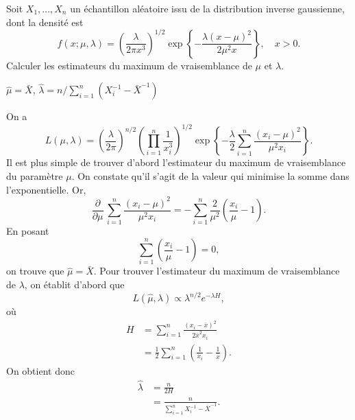 \begin{exercice}
  Soit $X_1, \dots, X_n$ un échantillon aléatoire issu de la
  distribution inverse gaussienne, dont la densité est
  \begin{displaymath}
    f(x; \mu,\lambda) =
    \left(
      \frac{\lambda}{2\pi x^3}
    \right)^{1/2}
    \exp\left\{
      -\frac{\lambda (x - \mu)^2}{2\mu^2 x}
    \right\}, \quad x > 0.
  \end{displaymath}
  Calculer les estimateurs du maximum de vraisemblance de $\mu$ et $\lambda$.
  \begin{rep}
    $\hat{\mu} = \bar{X}$, $\hat{\lambda} = n/\sum_{i = 1}^n
    (X_i^{-1} - \bar{X}^{-1})$
  \end{rep}
  \begin{sol}
    On a
    \begin{equation*}
      L(\mu ,\lambda) =
      \left(
        \frac{\lambda}{2\pi}
      \right)^{n/2}
      \left(
        \prod_{i = 1}^n \frac{1}{x_i^3}
      \right)^{1/2}
      \exp\left\{
        -\frac{\lambda}{2}
        \sum_{i=1}^n \frac{(x_i - \mu)^2}{\mu^2 x_i}
      \right\}.
    \end{equation*}
    Il est plus simple de trouver d'abord l'estimateur du maximum de
    vraisemblance du paramètre $\mu$. On constate qu'il s'agit de la
    valeur qui minimise la somme dans l'exponentielle. Or,
    \begin{equation*}
      \frac{\partial}{\partial \mu}\,
      \sum_{i=1}^n \frac{(x_i - \mu)^2}{\mu^2 x_i} =
      -\sum_{i=1}^n \frac{2}{\mu^2}
      \left( \frac{x_i}{\mu} - 1 \right).
    \end{equation*}
    En posant
    \begin{equation*}
      \sum_{i=1}^n \left( \frac{x_i}{\mu} - 1 \right) = 0,
    \end{equation*}
    on trouve que $\hat{\mu} = \bar{X}$. Pour trouver l'estimateur du
    maximum de vraisemblance de $\lambda$, on établit d'abord que
    \begin{displaymath}
      L(\hat{\mu}, \lambda) \propto \lambda^{n/2} e^{-\lambda H},
    \end{displaymath}
    où
    \begin{align*}
      H &= \sum_{i = 1}^n \frac{(x_i - \bar{x})^2}{2 \bar{x}^2 x_i} \\
      &= \frac{1}{2} \sum_{i = 1}^n
      \left(
        \frac{1}{x_i} - \frac{1}{\bar{x}}
      \right).
    \end{align*}
    On obtient donc
    \begin{align*}
      \hat{\lambda} &= \frac{n}{2H}\\
      &= \frac{n}{\sum_{i = 1}^n X_i^{-1} - \bar{X}^{-1}}.
    \end{align*}
  \end{sol}
\end{exercice}


